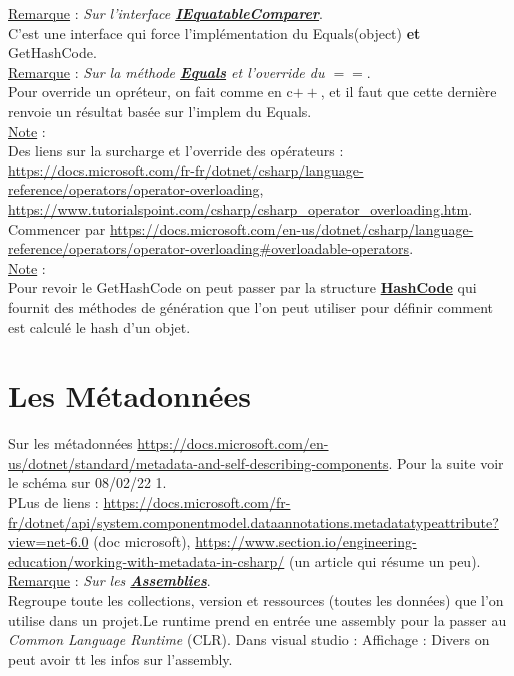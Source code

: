 \documentclass[a4paper,12pt,twoside]{article}
\newcommand{\urlcolor}{magenta}  %
\newcommand{\keycolor}{purple} %
\newcommand{\rem}[2]{\noindent\underline{Remarque} : \textit{#1}.\\ \indent #2}
\newcommand{\note}[1]{\noindent\underline{Note} : \\ \indent #1}
\newcommand{\keyref}[2]{\hypersetup{urlcolor=\keycolor} \href{#1}{\textbf{#2}}\hypersetup{urlcolor=\urlcolor}}
\begin{document}
\rem{Sur l'interface \keyref{https://docs.microsoft.com/fr-fr/dotnet/api/system.collections.iequalitycomparer?view=net-6.0}{IEquatableComparer}}{C'est une interface qui force l'implémentation du Equals(object) \textbf{et} GetHashCode.}\\

\rem{Sur la méthode \keyref{https://docs.microsoft.com/fr-fr/dotnet/api/system.iequatable-1.equals?view=net-6.0\#system-iequatable-1-equals(-0)}{Equals} et l'override du $==$}{Pour override un opréteur, on fait comme en c$++$, et il faut que cette dernière renvoie un résultat basée sur l'implem du Equals.}\\

\note{Des liens sur la surcharge et l'override des opérateurs : \url{https://docs.microsoft.com/fr-fr/dotnet/csharp/language-reference/operators/operator-overloading}, \url{https://www.tutorialspoint.com/csharp/csharp_operator_overloading.htm}. Commencer par \url{https://docs.microsoft.com/en-us/dotnet/csharp/language-reference/operators/operator-overloading\#overloadable-operators}.}\\

\note{Pour revoir le GetHashCode on peut passer par la structure \keyref{https://docs.microsoft.com/fr-fr/dotnet/api/system.hashcode?view=net-6.0}{HashCode} qui fournit des méthodes de génération que l'on peut utiliser pour définir comment est calculé le hash d'un objet.}\\

\section{Les Métadonnées}

Sur les métadonnées \url{https://docs.microsoft.com/en-us/dotnet/standard/metadata-and-self-describing-components}. Pour la suite voir le schéma sur 08/02/22 1.\\
PLus de liens : \url{https://docs.microsoft.com/fr-fr/dotnet/api/system.componentmodel.dataannotations.metadatatypeattribute?view=net-6.0} (doc microsoft), \url{https://www.section.io/engineering-education/working-with-metadata-in-csharp/} (un article qui résume un peu).\\

\rem{Sur les \keyref{https://docs.microsoft.com/en-us/dotnet/standard/assembly/}{Assemblies}}{Regroupe toute les collections, version et ressources (toutes les données) que l'on utilise dans un projet.Le runtime prend en entrée une assembly pour la passer au \textit{Common Language Runtime} (CLR). Dans visual studio : Affichage : Divers on peut avoir tt les infos sur l'assembly.}\\
\end{document}
